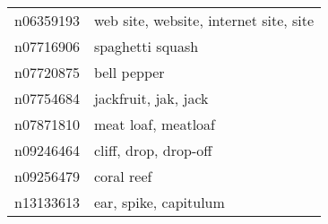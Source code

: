 \begin{appendices}
\begin{longtabu}{X|X[4]}
    		n06359193 &                                                                                     web site, website, internet site, site \tabularnewline
    		n07716906 &                                                                                                           spaghetti squash \tabularnewline
    		n07720875 &                                                                                                                bell pepper \tabularnewline
    		n07754684 &                                                                                                       jackfruit, jak, jack \tabularnewline
    		n07871810 &                                                                                                        meat loaf, meatloaf \tabularnewline
    		n09246464 &                                                                                                      cliff, drop, drop-off \tabularnewline
    		n09256479 &                                                                                                                 coral reef \tabularnewline
    		n13133613 &                                                                                                      ear, spike, capitulum \tabularnewline
    		\bottomrule
    	\end{longtabu}
    	
    \end{appendices}
\clearpage
    \endgroup
    
    
    